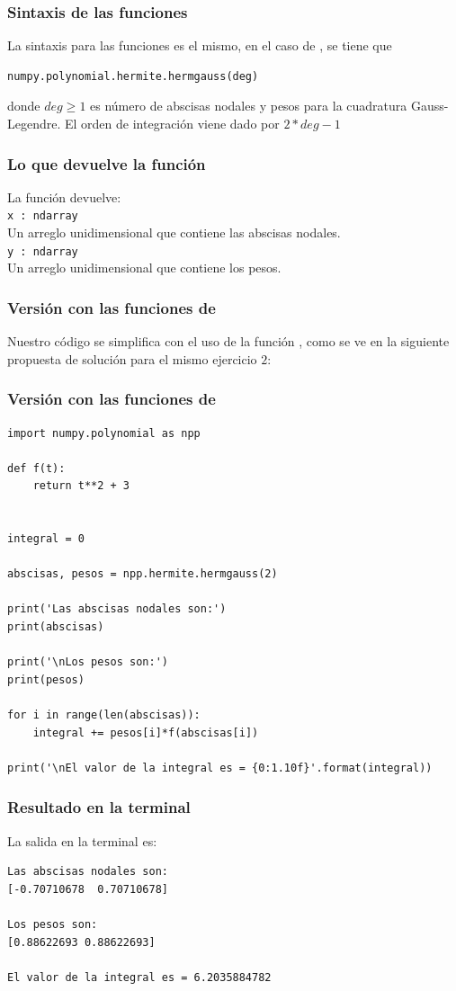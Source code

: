 \begin{frame}[fragile]
\frametitle{Sintaxis de las funciones}
La sintaxis para las funciones es el mismo, en el caso de , se tiene que
\begin{verbatim}
numpy.polynomial.hermite.hermgauss(deg)	
\end{verbatim}
donde $deg \geq 1$ es número de abscisas nodales y pesos para la cuadratura Gauss-Legendre. El orden de integración viene dado por $2 * deg - 1$
\end{frame}
\begin{frame}[fragile]
\frametitle{Lo que devuelve la función}
La función  devuelve:
\\
\bigskip
\verb|x : ndarray|
\\
Un arreglo unidimensional que contiene las abscisas nodales.
\\
\medskip
\verb|y : ndarray|
\\
Un arreglo unidimensional que contiene los pesos.
\end{frame}
\begin{frame}
\frametitle{Versión con las funciones de }
Nuestro código se simplifica con el uso de la función , como se ve en la siguiente propuesta de solución para el mismo ejercicio $2$:
\end{frame}
\begin{frame}
\frametitle{Versión con las funciones de }
\begin{lstlisting}[caption=Versión 2 del código para el ejercicio, style=FormattedNumber, basicstyle=\linespread{1.1}\ttfamily=\tiny, columns=fullflexible]
import numpy.polynomial as npp

def f(t):
	return t**2 + 3


integral = 0

abscisas, pesos = npp.hermite.hermgauss(2)

print('Las abscisas nodales son:')
print(abscisas)

print('\nLos pesos son:')
print(pesos)

for i in range(len(abscisas)):
	integral += pesos[i]*f(abscisas[i])

print('\nEl valor de la integral es = {0:1.10f}'.format(integral))
\end{lstlisting}
\end{frame}
\begin{frame}[fragile]
\frametitle{Resultado en la terminal}
La salida en la terminal es:
\begin{verbatim}
Las abscisas nodales son:
[-0.70710678  0.70710678]

Los pesos son:
[0.88622693 0.88622693]

El valor de la integral es = 6.2035884782
\end{verbatim}
\end{frame}
